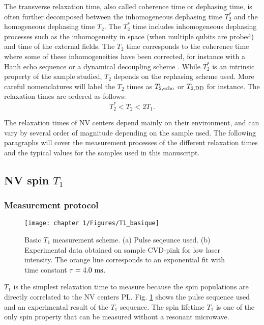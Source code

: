\documentclass[a4paper, 11pt]{book}
\begin{document}
The transverse relaxation time, also called coherence time or dephasing time, is often further decomposed between the inhomogeneous dephasing time $T_2^*$ and the homogeneous dephasing time $T_2$. The $T_2^*$ time includes inhomogeneous dephasing processes such as the inhomogeneity in space (when multiple qubits are probed) and time of the external fields. The $T_2$ time corresponds to the coherence time where some of these inhomogeneities have been corrected, for instance with a Hanh echo sequence \citep{hahn1950spin} or a dynamical decoupling scheme \citep{naydenov2011dynamical}. While $T_2^*$ is an intrinsic property of the sample studied, $T_2$ depends on the rephasing scheme used. More careful nomenclatures will label the $T_2$ times as $T_{2,\rm echo}$ or $T_{2,\rm DD}$ \citep{de2021materials} for instance. The relaxation times are ordered as follows:
\begin{equation}
T_2^* < T_2 < 2 T_1.
\end{equation}

The relaxation times of NV centers depend mainly on their environment, and can vary by several order of magnitude depending on the sample used. The following paragraphs will cover the measurement processes of the different relaxation times and the typical values for the samples used in this manuscript.

\subsection{NV spin $T_1$}
\label{sec T1 NV}
\subsubsection{Measurement protocol}
\begin{figure}[h!]
\centering
\texttt{[image: chapter 1/Figures/T1\_basique]}
\caption{Basic $T_1$ measurement scheme. (a) Pulse seqeunce used. (b) Experimental data obtained on sample CVD-pink for low laser intensity. The orange line corresponds to an exponential fit with time constant $\tau=4.0\ \rm ms$.}
\label{T1 basique}
\end{figure}


$T_1$ is the simplest relaxation time to measure because the spin populations are directly correlated to the NV centers PL. Fig. \ref{T1 basique} shows the pulse sequence used and an experimental result of the $T_1$ sequence. The spin lifetime $T_1$ is one of the only spin property that can be measured without a resonant microwave.
\end{document}

